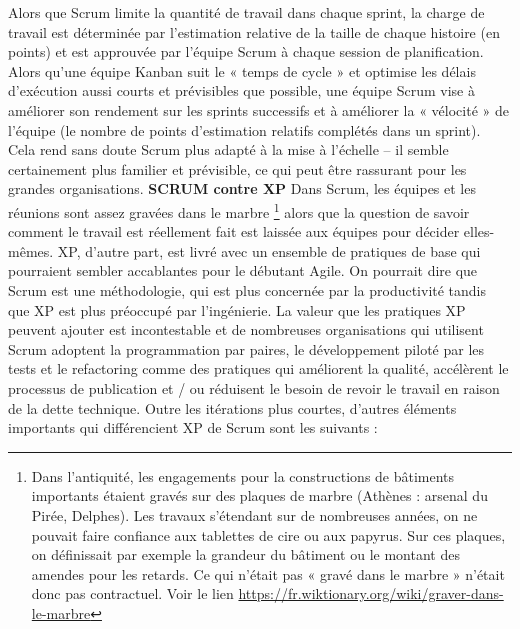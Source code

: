 Alors que Scrum limite la quantité de travail dans chaque sprint, la charge de travail est déterminée par l’estimation relative de la taille de chaque histoire (en points) et est approuvée par l’équipe Scrum à chaque session de planification. \newline
Alors qu’une équipe Kanban suit le « temps de cycle » et optimise les délais d’exécution aussi courts et prévisibles que possible, une équipe Scrum vise à améliorer son rendement sur les sprints successifs et à améliorer la « vélocité » de l’équipe (le nombre de points d’estimation relatifs complétés dans un sprint). Cela rend sans doute Scrum plus adapté à la mise à l’échelle – il semble certainement plus familier et prévisible, ce qui peut être rassurant pour les grandes organisations. \newline\newline
\textbf{SCRUM contre XP}
\newline
Dans Scrum, les équipes et les réunions sont assez gravées dans le marbre \footnote{Dans l’antiquité, les engagements pour la constructions de bâtiments importants étaient gravés sur des plaques de marbre (Athènes : arsenal du Pirée, Delphes). Les travaux s’étendant sur de nombreuses années, on ne pouvait faire confiance aux tablettes de cire ou aux papyrus. Sur ces plaques, on définissait par exemple la grandeur du bâtiment ou le montant des amendes pour les retards. Ce qui n’était pas « gravé dans le marbre » n’était donc pas contractuel. Voir le lien \href{https://fr.wiktionary.org/wiki/graver_dans_le_marbre}{https://fr.wiktionary.org/wiki/graver-dans-le-marbre}} alors que la question de savoir comment le travail est réellement fait est laissée aux équipes pour décider elles-mêmes. XP, d’autre part, est livré avec un ensemble de pratiques de base qui pourraient sembler accablantes pour le débutant Agile. \newline
On pourrait dire que Scrum est une méthodologie, qui est plus concernée par la productivité tandis que XP est plus préoccupé par l’ingénierie. \newline
La valeur que les pratiques XP peuvent ajouter est incontestable et de nombreuses organisations qui utilisent Scrum adoptent la programmation par paires, le développement piloté par les tests et le refactoring comme des pratiques qui améliorent la qualité, accélèrent le processus de publication et / ou réduisent le besoin de revoir le travail en raison de la dette technique. \newline
Outre les itérations plus courtes, d’autres éléments importants qui différencient XP de Scrum sont les suivants :

